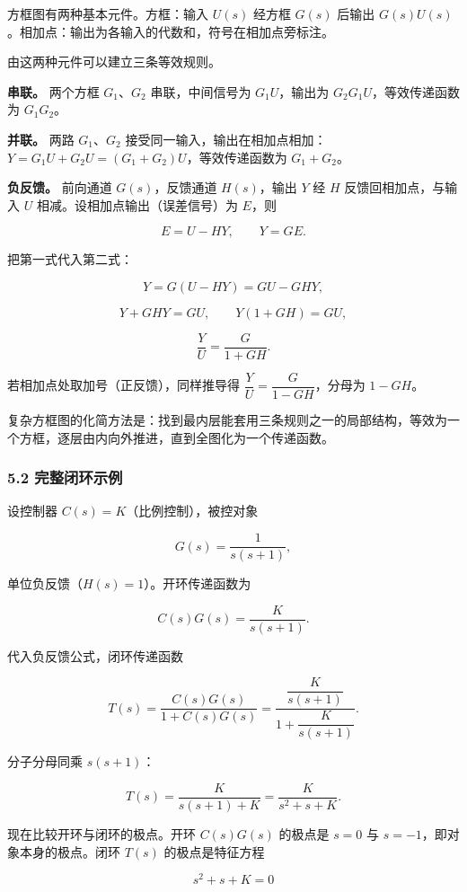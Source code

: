 \documentclass[12pt]{ctexart}
\begin{document}
方框图有两种基本元件。方框：输入 \(U(s)\) 经方框 \(G(s)\) 后输出
\(G(s)U(s)\)。相加点：输出为各输入的代数和，符号在相加点旁标注。

由这两种元件可以建立三条等效规则。

\textbf{串联。} 两个方框 \(G_1\)、\(G_2\) 串联，中间信号为
\(G_1U\)，输出为 \(G_2G_1U\)，等效传递函数为 \(G_1G_2\)。

\textbf{并联。} 两路 \(G_1\)、\(G_2\)
接受同一输入，输出在相加点相加：\(Y=G_1U+G_2U=(G_1+G_2)U\)，等效传递函数为
\(G_1+G_2\)。

\textbf{负反馈。} 前向通道 \(G(s)\)，反馈通道 \(H(s)\)，输出 \(Y\) 经
\(H\) 反馈回相加点，与输入 \(U\) 相减。设相加点输出（误差信号）为
\(E\)，则

\[
E=U-HY,\qquad Y=GE.
\]

把第一式代入第二式：

\[
Y=G(U-HY)=GU-GHY,
\]

\[
Y+GHY=GU,\qquad Y(1+GH)=GU,
\]

\[
\frac{Y}{U}=\frac{G}{1+GH}.
\]

若相加点处取加号（正反馈），同样推导得
\(\dfrac{Y}{U}=\dfrac{G}{1-GH}\)，分母为 \(1-GH\)。

复杂方框图的化简方法是：找到最内层能套用三条规则之一的局部结构，等效为一个方框，逐层由内向外推进，直到全图化为一个传递函数。

\hypertarget{ux5b8cux6574ux95edux73afux793aux4f8b}{%
\subsubsection{5.2
完整闭环示例}\label{ux5b8cux6574ux95edux73afux793aux4f8b}}

设控制器 \(C(s)=K\)（比例控制），被控对象

\[
G(s)=\frac{1}{s(s+1)},
\]

单位负反馈（\(H(s)=1\)）。开环传递函数为

\[
C(s)G(s)=\frac{K}{s(s+1)}.
\]

代入负反馈公式，闭环传递函数

\[
T(s)=\frac{C(s)G(s)}{1+C(s)G(s)}=\frac{\dfrac{K}{s(s+1)}}{1+\dfrac{K}{s(s+1)}}.
\]

分子分母同乘 \(s(s+1)\)：

\[
T(s)=\frac{K}{s(s+1)+K}=\frac{K}{s^{2}+s+K}.
\]

现在比较开环与闭环的极点。开环 \(C(s)G(s)\) 的极点是 \(s=0\) 与
\(s=-1\)，即对象本身的极点。闭环 \(T(s)\) 的极点是特征方程

\[
s^{2}+s+K=0
\]
\end{document}
